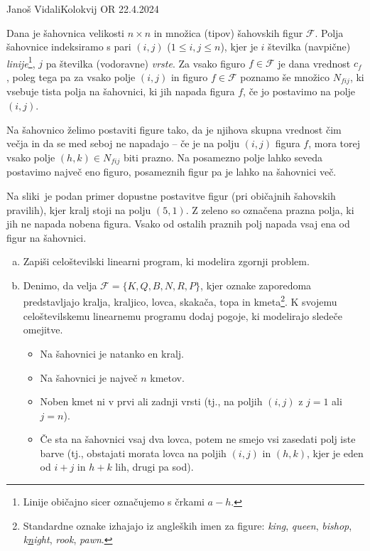\begin{naloga}{Janoš Vidali}{Kolokvij OR 22.4.2024}
\begin{vprasanje}
Dana je šahovnica velikosti $n \times n$
in množica (tipov) šahovskih figur $\mathcal{F}$.
Polja šahovnice indeksiramo s pari $(i, j)$ ($1 \le i, j \le n$),
kjer je $i$ številka (navpične) {\em linije}\footnote{%
Linije običajno sicer označujemo s črkami $a - h$.
},
$j$ pa številka (vodoravne) {\em vrste}.
Za vsako figuro $f \in \mathcal{F}$ je dana vrednost $c_f$,
poleg tega pa za vsako polje $(i, j)$ in figuro $f \in \mathcal{F}$
poznamo še množico $N_{fij}$,
ki vsebuje tista polja na šahovnici, ki jih napada figura $f$,
če jo postavimo na polje $(i, j)$.

Na šahovnico želimo postaviti figure tako,
da je njihova skupna vrednost čim večja
in da se med seboj ne napadajo --
če je na polju $(i, j)$ figura $f$,
mora torej vsako polje $(h, k) \in N_{fij}$ biti prazno.
Na posamezno polje lahko seveda postavimo največ eno figuro,
posameznih figur pa je lahko na šahovnici več.

Na sliki~\fig je podan primer dopustne postavitve figur
(pri običajnih šahovskih pravilih),
kjer kralj stoji na polju $(5, 1)$.
Z zeleno so označena prazna polja, ki jih ne napada nobena figura.
Vsako od ostalih praznih polj napada vsaj ena od figur na šahovnici.

\begin{enumerate}[(a)]
\item Zapiši celoštevilski linearni program, ki modelira zgornji problem.
\item Denimo, da velja $\mathcal{F} = \{K, Q, B, N, R, P\}$,
kjer oznake zaporedoma predstavljajo
kralja, kraljico, lovca, skakača, topa in kmeta\footnote{%
Standardne oznake izhajajo iz angleških imen za figure: {\em king}, {\em queen},
{\em bishop}, {\em k\underline{n}ight}, {\em rook}, {\em pawn}.
}.
K svojemu celoštevilskemu linearnemu programu dodaj pogoje,
ki modelirajo sledeče omejitve.
\begin{itemize}
\item Na šahovnici je natanko en kralj.
\item Na šahovnici je največ $n$ kmetov.
\item Noben kmet ni v prvi ali zadnji vrsti
(tj., na poljih $(i, j)$ z $j = 1$ ali $j = n$).
\item Če sta na šahovnici vsaj dva lovca,
potem ne smejo vsi zasedati polj iste barve
(tj., obstajati morata lovca na poljih $(i, j)$ in $(h, k)$,
kjer je eden od $i+j$ in $h+k$ lih, drugi pa sod).
\end{itemize}
\end{enumerate}


\end{vprasanje}
\end{naloga}
